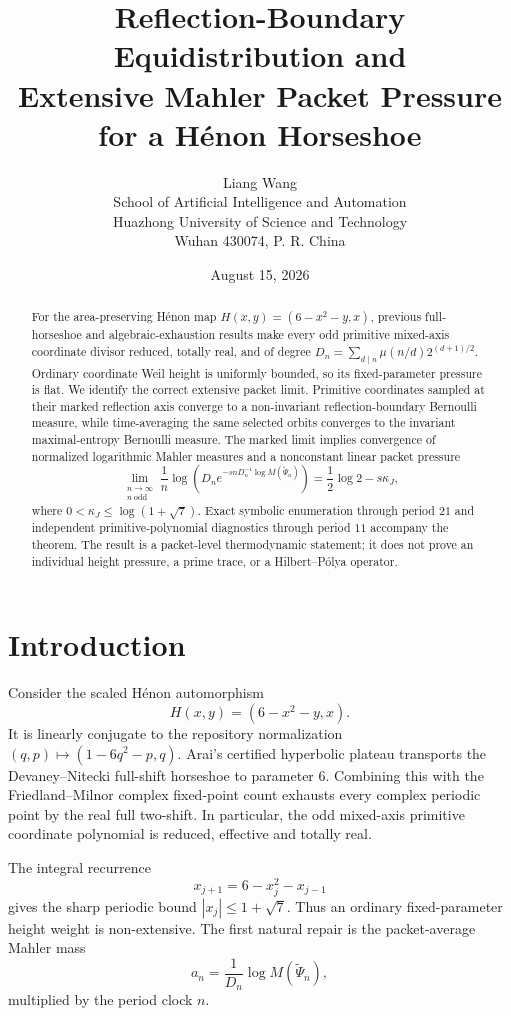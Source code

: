 \documentclass[11pt]{article}
\title{Reflection-Boundary Equidistribution and\\
Extensive Mahler Packet Pressure for a H\'enon Horseshoe}
\author{Liang Wang\\
\small School of Artificial Intelligence and Automation\\
\small Huazhong University of Science and Technology\\
\small Wuhan 430074, P. R. China}
\date{August 15, 2026}
\theoremstyle{remark}
\begin{document}
\maketitle

\begin{abstract}
For the area-preserving H\'enon map
$H(x,y)=(6-x^2-y,x)$, previous full-horseshoe and algebraic-exhaustion
results make every odd primitive mixed-axis coordinate divisor reduced,
totally real, and of degree
$D_n=\sum_{d\mid n}\mu(n/d)2^{(d+1)/2}$.  Ordinary coordinate Weil
height is uniformly bounded, so its fixed-parameter pressure is flat.  We
identify the correct extensive packet limit.  Primitive coordinates sampled
at their marked reflection axis converge to a non-invariant
reflection-boundary Bernoulli measure, while time-averaging the same selected
orbits converges to the invariant maximal-entropy Bernoulli measure.  The
marked limit implies convergence of normalized logarithmic Mahler measures
and a nonconstant linear packet pressure
\[
 \lim_{\substack{n\to\infty\\ n\ \mathrm{odd}}}
 \frac1n\log\!\left(D_ne^{-snD_n^{-1}\log M(\widetilde\Psi_n)}\right)
 =\frac12\log2-s\kappa_J,
\]
where $0<\kappa_J\le\log(1+\sqrt7)$.  Exact symbolic enumeration through
period $21$ and independent primitive-polynomial diagnostics through period
$11$ accompany the theorem.  The result is a packet-level thermodynamic
statement; it does not prove an individual height pressure, a prime trace,
or a Hilbert--P\'olya operator.
\end{abstract}

\section{Introduction}

Consider the scaled H\'enon automorphism
\begin{equation}\label{eq:H}
 H(x,y)=(6-x^2-y,x).
\end{equation}
It is linearly conjugate to the repository normalization
$(q,p)\mapsto(1-6q^2-p,q)$.  Arai's certified hyperbolic plateau
\cite{Arai2007} transports the Devaney--Nitecki full-shift horseshoe
\cite{DevaneyNitecki1979} to parameter $6$.  Combining this with the
Friedland--Milnor complex fixed-point count \cite{FriedlandMilnor1989}
exhausts every complex periodic point by the real full two-shift.  In
particular, the odd mixed-axis primitive coordinate polynomial is reduced,
effective and totally real.

The integral recurrence
\begin{equation}\label{eq:recurrence}
 x_{j+1}=6-x_j^2-x_{j-1}
\end{equation}
gives the sharp periodic bound $|x_j|\le1+\sqrt7$.  Thus an ordinary
fixed-parameter height weight is non-extensive.  The first natural repair is
the packet-average Mahler mass
\begin{equation}\label{eq:an-intro}
 a_n=\frac1{D_n}\log M(\widetilde\Psi_n),
\end{equation}
multiplied by the period clock $n$.
\end{document}
